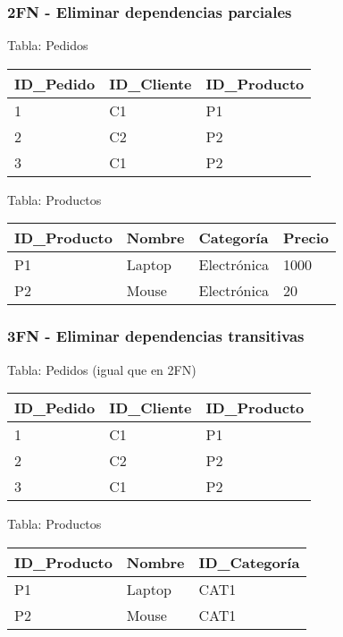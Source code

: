 \documentclass[12pt]{article}
\begin{document}
\subsubsection{2FN - Eliminar dependencias parciales}

Tabla: Pedidos
\begin{center}
\begin{tabular}{lll}
\toprule
ID\_Pedido & ID\_Cliente & ID\_Producto \\
\midrule
1 & C1 & P1 \\
2 & C2 & P2 \\
3 & C1 & P2 \\
\bottomrule
\end{tabular}
\end{center}

Tabla: Productos
\begin{center}
\begin{tabular}{llll}
\toprule
ID\_Producto & Nombre & Categoría & Precio \\
\midrule
P1 & Laptop & Electrónica & 1000 \\
P2 & Mouse & Electrónica & 20 \\
\bottomrule
\end{tabular}
\end{center}

\subsubsection{3FN - Eliminar dependencias transitivas}

Tabla: Pedidos (igual que en 2FN)
\begin{center}
\begin{tabular}{lll}
\toprule
ID\_Pedido & ID\_Cliente & ID\_Producto \\
\midrule
1 & C1 & P1 \\
2 & C2 & P2 \\
3 & C1 & P2 \\
\bottomrule
\end{tabular}
\end{center}

Tabla: Productos
\begin{center}
\begin{tabular}{lll}
\toprule
ID\_Producto & Nombre & ID\_Categoría \\
\midrule
P1 & Laptop & CAT1 \\
P2 & Mouse & CAT1 \\
\bottomrule
\end{tabular}
\end{center}
\end{document}
